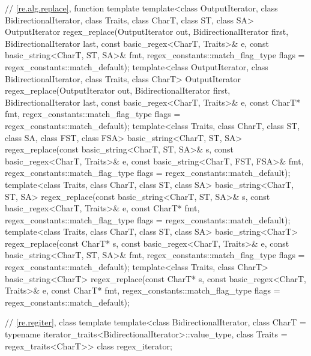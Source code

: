 \begin{codeblock}
{  // \ref{re.alg.replace}, function template 
  template<class OutputIterator, class BidirectionalIterator,
           class Traits, class CharT, class ST, class SA>
    OutputIterator
      regex_replace(OutputIterator out,
                    BidirectionalIterator first, BidirectionalIterator last,
                    const basic_regex<CharT, Traits>& e,
                    const basic_string<CharT, ST, SA>& fmt,
                    regex_constants::match_flag_type flags = regex_constants::match_default);
  template<class OutputIterator, class BidirectionalIterator, class Traits, class CharT>
    OutputIterator
      regex_replace(OutputIterator out,
                    BidirectionalIterator first, BidirectionalIterator last,
                    const basic_regex<CharT, Traits>& e,
                    const CharT* fmt,
                    regex_constants::match_flag_type flags = regex_constants::match_default);
  template<class Traits, class CharT, class ST, class SA, class FST, class FSA>
    basic_string<CharT, ST, SA>
      regex_replace(const basic_string<CharT, ST, SA>& s,
                    const basic_regex<CharT, Traits>& e,
                    const basic_string<CharT, FST, FSA>& fmt,
                    regex_constants::match_flag_type flags = regex_constants::match_default);
  template<class Traits, class CharT, class ST, class SA>
    basic_string<CharT, ST, SA>
      regex_replace(const basic_string<CharT, ST, SA>& s,
                    const basic_regex<CharT, Traits>& e,
                    const CharT* fmt,
                    regex_constants::match_flag_type flags = regex_constants::match_default);
  template<class Traits, class CharT, class ST, class SA>
    basic_string<CharT>
      regex_replace(const CharT* s,
                    const basic_regex<CharT, Traits>& e,
                    const basic_string<CharT, ST, SA>& fmt,
                    regex_constants::match_flag_type flags = regex_constants::match_default);
  template<class Traits, class CharT>
    basic_string<CharT>
      regex_replace(const CharT* s,
                    const basic_regex<CharT, Traits>& e,
                    const CharT* fmt,
                    regex_constants::match_flag_type flags = regex_constants::match_default);

  // \ref{re.regiter}, class template 
  template<class BidirectionalIterator,
           class CharT = typename iterator_traits<BidirectionalIterator>::value_type,
           class Traits = regex_traits<CharT>>
    class regex_iterator;

}
\end{codeblock}
